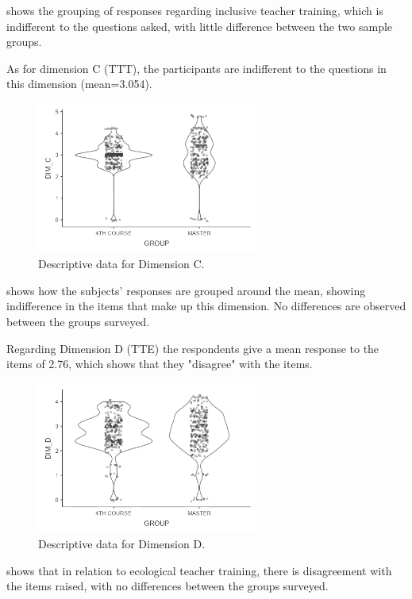 \documentclass[english]{textolivre}
\begin{document}
 shows the grouping of responses regarding inclusive teacher training, which is indifferent to the questions asked, with little difference between the two sample groups.

As for dimension C (TTT), the participants are indifferent to the questions in this dimension (mean=3.054).

\begin{figure}[htbp]
 \centering
 \includegraphics[width=0.65\textwidth]{fig3.pdf}
 \caption{Descriptive data for Dimension C.}
 \label{fig3}
\end{figure}

 shows how the subjects’ responses are grouped around the mean, showing indifference in the items that make up this dimension. No differences are observed between the groups surveyed.

Regarding Dimension D (TTE) the respondents give a mean response to the items of 2.76, which shows that they "disagree" with the items.

\begin{figure}[htbp]
 \centering
 \includegraphics[width=0.65\textwidth]{fig4.pdf}
 \caption{Descriptive data for Dimension D.}
 \label{fig4}
\end{figure}

 shows that in relation to ecological teacher training, there is disagreement with the items raised, with no differences between the groups surveyed.
\end{document}

